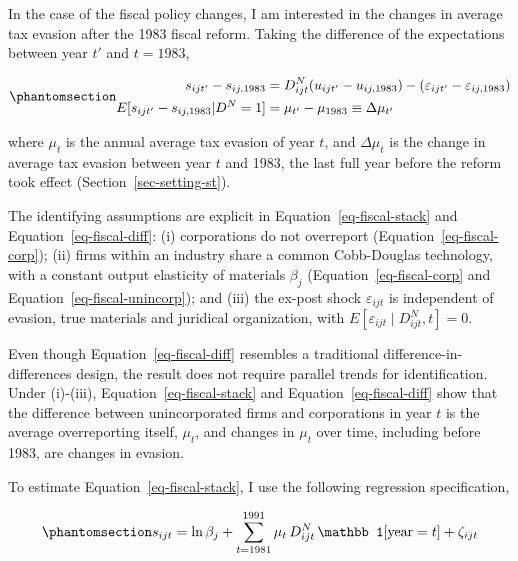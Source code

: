\documentclass[
  12pt,
  letterpaper,
  oneside,
  openany]{report}
\begin{document}
In the case of the fiscal policy changes, I am interested in the changes
in average tax evasion after the 1983 fiscal reform. Taking the
difference of the expectations between year \(t'\) and \(t=1983\),

\begin{equation}\protect\phantomsection\label{eq-fiscal-diff}{
\begin{aligned}
    s_{ijt'} - s_{ij,1983}
     &= D_{ijt}^N  (u_{ijt'} - u_{ij,1983}) - (\varepsilon_{ijt'} - \varepsilon_{ij,1983}) \\
    E[s_{ijt'}-s_{ij,1983}|D^{N}=1] &= \mu_{t'} - \mu_{1983} \equiv \Delta\mu_{t'}
\end{aligned}
}\end{equation}

where \(\mu_t\) is the annual average tax evasion of year \(t\), and
\(\Delta\mu_{t}\) is the change in average tax evasion between year
\(t\) and 1983, the last full year before the reform took effect
(Section~\ref{sec-setting-st}).

The identifying assumptions are explicit in
Equation~\ref{eq-fiscal-stack} and Equation~\ref{eq-fiscal-diff}: (i)
corporations do not overreport (Equation~\ref{eq-fiscal-corp}); (ii)
firms within an industry share a common Cobb-Douglas technology, with a
constant output elasticity of materials \(\beta_j\)
(Equation~\ref{eq-fiscal-corp} and Equation~\ref{eq-fiscal-unincorp});
and (iii) the ex-post shock \(\varepsilon_{ijt}\) is independent of
evasion, true materials and juridical organization, with
\(E[\varepsilon_{ijt}\mid D^N_{ijt},t]=0\).

Even though Equation~\ref{eq-fiscal-diff} resembles a traditional
difference-in-differences design, the result does not require parallel
trends for identification. Under (i)-(iii),
Equation~\ref{eq-fiscal-stack} and Equation~\ref{eq-fiscal-diff} show
that the difference between unincorporated firms and corporations in
year \(t\) is the average overreporting itself, \(\mu_t\), and changes
in \(\mu_t\) over time, including before 1983, are changes in evasion.

To estimate Equation~\ref{eq-fiscal-stack}, I use the following
regression specification,

\begin{equation}\protect\phantomsection\label{eq-fiscal-lvl-reg}{
    s_{ijt} = \ln\beta_j + \sum_{t=1981}^{1991} \mu_t\, D_{ijt}^N\,\mathbb 1[\text{year}=t] + \zeta_{ijt}
}\end{equation}
\end{document}
